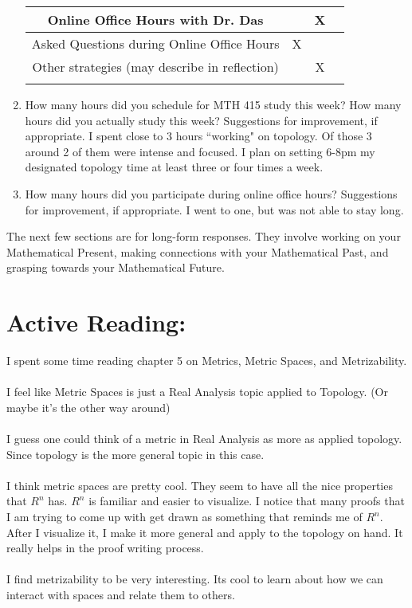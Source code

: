 \documentclass[11pt]{article}
\begin{document}
\begin{enumerate}
\begin{tabular}{|c|c|c|c|}
		Online Office Hours with Dr. Das &&X&\\
		\hline		
		Asked Questions during Online Office Hours &X&&\\
		\hline
		\hline
		
		Other strategies (may describe in reflection) &&X&\\
		&&&\\
		\hline
		
			
	\end{tabular}

\item How many hours did you schedule for MTH 415 study this week? How many hours did you actually study this week? Suggestions for improvement, if appropriate.
\vfill
I spent close to 3 hours ``working" on topology. Of those 3 around 2 of them were intense and focused. I plan on setting 6-8pm my designated topology time at least three or four times a week.
\item How many hours did you participate during online office hours? Suggestions for improvement, if appropriate.
\vfill
I went to one, but was not able to stay long.

\end{enumerate}

\newpage
The next few sections are for long-form responses. They involve working on your Mathematical Present, making connections with your Mathematical Past, and grasping towards your Mathematical Future.

\section*{Active Reading:}

I spent some time reading chapter 5 on Metrics, Metric Spaces, and Metrizability. \\
\\
I feel like Metric Spaces is just a Real Analysis topic applied to Topology. (Or maybe it's the other way around)\\
\\
I guess one could think of a metric in Real Analysis as more as applied topology. Since topology is the more general topic in this case.\\
\\
I think metric spaces are pretty cool. They seem to have all the nice properties that $ R^n $ has. $ R^n $ is familiar and easier to visualize. I notice that many proofs that I am trying to come up with get drawn as something that reminds me of $ R^n $. After I visualize it, I make it more general and apply to the topology on hand. It really helps in the proof writing process.\\
\\
I find metrizability to be very interesting. Its cool to learn about how we can interact with spaces and relate them to others.
\end{document}
